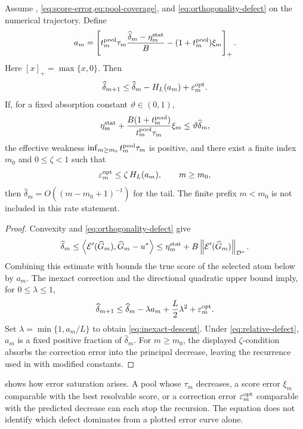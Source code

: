 \begin{theorem}
\label{thm:inexact}
Assume , \cref{eq:score-error,eq:pool-coverage}, and
\cref{eq:orthogonality-defect} on the numerical trajectory. Define
\[
 a_m=\left[
 t_m^{\rm pool}\tau_m\frac{\widehat\delta_m-\eta_m^{\rm stat}}{B}
 -(1+t_m^{\rm pool})\xi_m
 \right]_+.
\]
Here \([x]_+=\max\{x,0\}\).
Then
\begin{equation}
 \widehat\delta_{m+1}\leq\widehat\delta_m-H_L(a_m)+\varepsilon_m^{\rm opt}.
 \label{eq:inexact-descent}
\end{equation}
If, for a fixed absorption constant \(\vartheta\in(0,1)\),
\begin{equation}
 \eta_m^{\rm stat}+\frac{B(1+t_m^{\rm pool})}{t_m^{\rm pool}\tau_m}\xi_m
 \leq\vartheta\widehat\delta_m,
 \label{eq:relative-defect}
\end{equation}
the effective weakness \(\inf_{m\ge m_0} t_m^{\rm pool}\tau_m\) is positive, and there
exist a finite index \(m_0\) and \(0\leq\zeta<1\) such that
\[
  \varepsilon_m^{\rm opt}\leq\zeta\,H_L(a_m),\qquad m\ge m_0,
\]
then \(\widehat\delta_m=O((m-m_0+1)^{-1})\) for the tail. The finite prefix
\(m<m_0\) is not included in this rate statement.
\end{theorem}

\begin{proof}
Convexity and \cref{eq:orthogonality-defect} give
\[
 \widehat\delta_m
 \leq\left\langle \mathcal{E}'(\widehat G_m),\widehat G_m-u^*\right\rangle
 \leq\eta_m^{\rm stat}+B\left\lVert \mathcal{E}'(\widehat G_m)\right\rVert_{\mathcal{D}^*}.
\]
Combining this estimate with  bounds the true score of the selected atom below by
\(a_m\). The inexact correction and the directional quadratic upper bound imply, for
\(0\leq\lambda\leq1\),
\[
 \widehat\delta_{m+1}\leq\widehat\delta_m-\lambda a_m+\frac{L}{2}\lambda^2+\varepsilon_m^{\rm opt}.
\]
Set \(\lambda=\min\{1,a_m/L\}\) to obtain \cref{eq:inexact-descent}. Under
\cref{eq:relative-defect}, \(a_m\) is a fixed positive fraction of \(\widehat\delta_m\). For
\(m\ge m_0\), the displayed \(\zeta\)-condition absorbs the correction error into the
principal decrease, leaving the recurrence used in  with modified constants.
\end{proof}

\begin{remark}
 shows how error saturation arises. A pool whose
\(\tau_m\) decreases, a score error \(\xi_m\) comparable with the best resolvable score, or a correction
error \(\varepsilon_m^{\rm opt}\) comparable with the predicted decrease can each stop the recursion. The equation
does not identify which defect dominates from a plotted error curve alone.
\end{remark}

